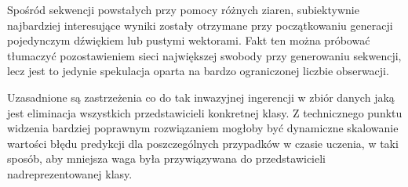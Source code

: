 {{        Spośród sekwencji powstałych przy pomocy różnych ziaren, subiektywnie najbardziej interesujące wyniki
        zostały otrzymane przy początkowaniu generacji pojedynczym dźwiękiem lub pustymi wektorami.
        Fakt ten można próbować tłumaczyć pozostawieniem sieci największej swobody przy generowaniu sekwencji, lecz
        jest to jedynie spekulacja oparta na bardzo ograniczonej liczbie obserwacji.

        \bigskip

        Uzasadnione są zastrzeżenia co do tak inwazyjnej ingerencji w zbiór danych jaką jest eliminacja 
        wszystkich przedstawicieli konkretnej klasy. Z technicznego punktu widzenia bardziej poprawnym 
        rozwiązaniem mogłoby być dynamiczne skalowanie wartości błędu predykcji dla poszczególnych przypadków w czasie uczenia, 
        w taki sposób, aby mniejsza waga była przywiązywana do przedstawicieli nadreprezentowanej klasy.
    }
}